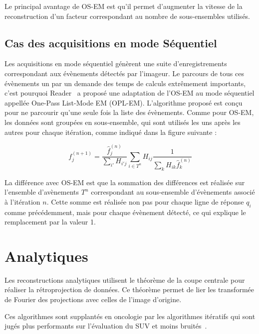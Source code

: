 Le principal avantage de OS-EM est qu'il permet d'augmenter la vitesse de la reconstruction d'un facteur correspondant au nombre de sous-ensembles utilisés.

	\subsection{Cas des acquisitions en mode Séquentiel}
\label{lab:OPLEM}

Les acquisitions en mode séquentiel génèrent une suite d'enregistrements correspondant aux évènements détectés par l'imageur. Le parcours de tous ces évènements un par un demande des temps de calculs extrêmement importants, c'est pourquoi Reader~\cite{reader2002one} a proposé une adaptation de l'OS-EM au mode séquentiel appellée One-Pass List-Mode EM (OPL-EM). L'algorithme proposé est conçu pour ne parcourir qu'une seule fois la liste des évènements. Comme pour OS-EM, les données sont groupées en sous-ensemble, qui sont utilisés les uns après les autres pour chaque itération, comme indiqué dans la figure suivante :

\begin{equation}
	f_j^{(n+1)}=\frac{\hat{f}_j^{(n)}}{\sum\limits_{i'}H_{i'j}}\sum\limits_{i \in T^n}H_{ij}\frac{1}{\sum\limits_{k}H_{ik}\hat{f}_k^{(n)}}
\label{eq:OSEM_seq}
\end{equation}

La différence avec OS-EM est que la sommation des différences est réalisée sur l'ensemble d'avènements $T^n$ correspondant au sous-ensemble d'évènements associé à l'itération $n$. Cette somme est réalisée non pas pour chaque ligne de réponse $q_i$ comme précédemment, mais pour chaque évènement détecté, ce qui explique le remplacement par la valeur 1.
		
	\section{Analytiques}

Les reconstructions analytiques utilisent le théorème de la coupe centrale pour réaliser la rétroprojection de données. Ce théorème permet de lier les transformée de Fourier des projections avec celles de l'image d'origine. 
 
Ces algorithmes sont supplantés en oncologie par les algorithmes itératifs qui sont jugés plus performants sur l'évaluation du SUV et moins bruités~\cite{schoder2004clinical}.
